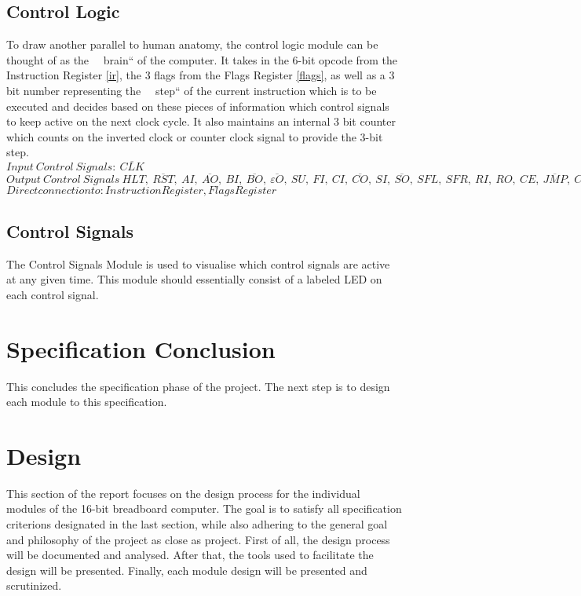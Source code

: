 \subsection{Control Logic} \label{control-logic}
To draw another parallel to human anatomy, the control logic module can be thought of as the ~~brain`` of the computer.
It takes in the 6-bit opcode from the Instruction Register \ref{ir}, the 3 flags from the Flags Register \ref{flags}, as well as
a 3 bit number representing the ~~step`` of the current instruction which is to be executed and decides based on these pieces
of information which control signals to keep active on the next clock cycle. It also maintains an internal 3 bit counter which
counts on the inverted clock or counter clock signal to provide the 3-bit step. \\
\textbf{$Input\:Control\:Signals:\:\overline{CLK}$}
\textbf{$Output\:Control\:Signals\: HLT,\:\overline{RST},\:AI,\:\overline{AO},\:BI,\:\overline{BO},\:\overline{\varepsilon O},\:SU,\: FI,\:CI,\:\overline{CO},\:SI,\:\overline{SO},\:SFL,\:SFR,\:RI,\:RO, \:CE, \:\overline{JMP},\: \overline{CNT_O},\:\overline{ST_I},\:\overline{ST_D},\:\overline{ST_J},\:\overline{ST_O},\:OUT,\: \overline{E},\:R/\overline{W},\:MI,\:II,\:\overline{IO}$}
\textbf{$Direct connection to: Instruction Register, Flags Register$}


\subsection{Control Signals} \label{control-sigs}
The Control Signals Module is used to visualise which control signals are active at any given time. This module should
essentially consist of a labeled LED on each control signal.

\section{Specification Conclusion}
This concludes the specification phase of the project. The next step is to design each module to this specification.

\section{Design}
This section of the report focuses on the design process for the individual modules of the 16-bit breadboard computer.
The goal is to satisfy all specification criterions designated in the last section, while also adhering to the general goal
and philosophy of the project as close as project. First of all, the design process will be documented and analysed. After that,
the tools used to facilitate the design will be presented. Finally, each module design will be presented and scrutinized.

